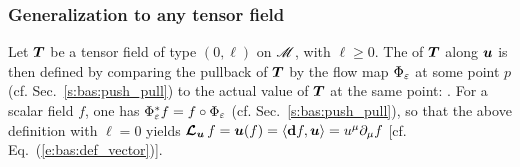 \subsubsection{Generalization to any tensor field} \label{s:bas:lie_der_tensor}

Let $\bm{T}$ be a tensor field of type $(0,\ell)$ on $\mathscr{M}$, with $\ell \geq 0$.
The  of $\bm{T}$ along $\bm{u}$ is then
defined by comparing the pullback of $\bm{T}$ by the flow map $\Phi_\varepsilon$ at some point $p$
(cf. Sec.~\ref{s:bas:push_pull})
to the actual value of $\bm{T}$ at the same point:
\be \label{e:bas:def_Lie_der_covar}
    .
\ee
For a scalar field $f$, one has $\Phi_\varepsilon^* f = f\circ \Phi_\varepsilon$
(cf. Sec.~\ref{s:bas:push_pull}), so that the above definition with $\ell=0$
yields
$\bm{\mathcal{L}}_{\bm{u}}\, f = \bm{u}(f) = \langle\mathbf{d} f, \bm{u} \rangle = u^\mu \partial_\mu f$ [cf. Eq.~(\ref{e:bas:def_vector})].

